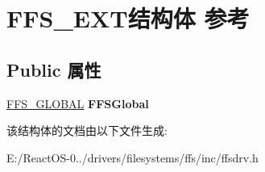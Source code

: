 \hypertarget{struct_f_f_s___e_x_t}{}\section{F\+F\+S\+\_\+\+E\+X\+T结构体 参考}
\label{struct_f_f_s___e_x_t}
\subsection*{Public 属性}
\begin{DoxyCompactItemize}
\item 
\mbox{\label{struct_f_f_s___e_x_t_ac5a55434c4df007a215a81ba17010dac}} 
\hyperlink{struct___f_f_s___g_l_o_b_a_l}{F\+F\+S\+\_\+\+G\+L\+O\+B\+AL} {\bfseries F\+F\+S\+Global}
\end{DoxyCompactItemize}


该结构体的文档由以下文件生成\+:\begin{DoxyCompactItemize}
\item 
E\+:/\+React\+O\+S-\/0../drivers/filesystems/ffs/inc/ffsdrv.\+h\end{DoxyCompactItemize}
